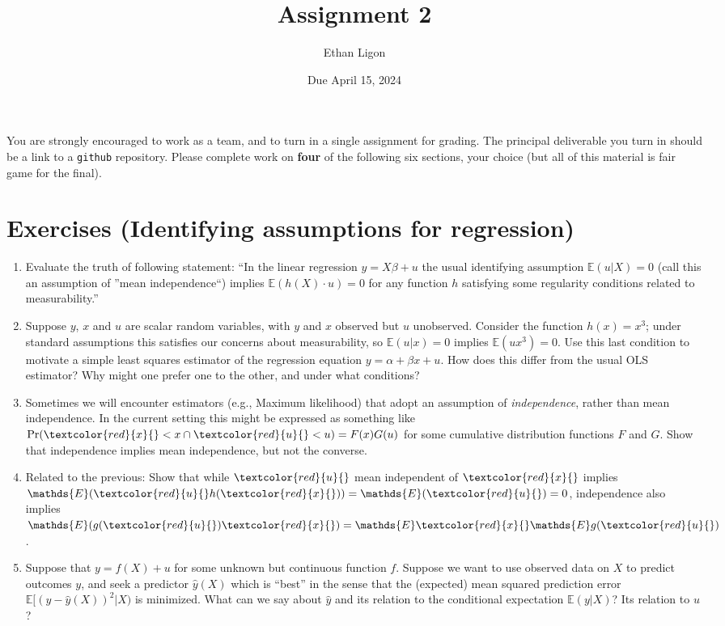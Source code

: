 \documentclass[12pt]{amsart}
\author{Ethan Ligon}
\date{Due April 15, 2024}
\title{Assignment 2}
\newcommand{\rv}[1]{\ensuremath{\textcolor{red}{#1}{}}}
\newcommand{\rvx}{\rv{x}}
\newcommand{\rvu}{\rv{u}}
\renewcommand{\E}{\ensuremath{\mathds{E}}}
\begin{document}
\maketitle
You are strongly encouraged to work as a  team, and to turn in a single assignment for grading.   The principal deliverable you turn in should be a link to a \texttt{github} repository.  Please complete work on \textbf{four} of the following six sections, your choice (but all of this material is fair game for the final).
\section{Exercises (Identifying assumptions for regression)}
\label{sec:org68430f5}

\begin{enumerate}
\item Evaluate the truth of following statement: ``In the linear regression \(y=X\beta + u\) the usual identifying assumption \(\E(u|X)=0\) (call this an assumption of ''mean independence``) implies \(\E(h(X)\cdot u)=0\) for any function \(h\) satisfying some regularity conditions related to measurability.''

\item Suppose \(y\), \(x\) and \(u\) are scalar random variables, with \(y\) and \(x\) observed but \(u\) unobserved.  Consider the function \(h(x)=x^3\); under standard assumptions this satisfies our concerns about measurability, so \(\E(u|x)=0\) implies \(\E(ux^3)=0\).   Use this last condition to motivate a simple least squares estimator of the regression equation \(y=\alpha + \beta x + u\).  How does this differ from the usual OLS estimator?  Why might one prefer one to the other, and under what conditions?

\item Sometimes we will encounter estimators (e.g., Maximum likelihood) that adopt an assumption of \emph{independence}, rather than mean independence.  In the current setting this might be expressed as something like \(\mbox{Pr}(\rvx<x \cap \rvu<u)=F(x)G(u)\) for some cumulative distribution functions \(F\) and \(G\).  Show that independence implies mean independence, but not the converse.

\item Related to the previous: Show that while \(\rvu\) mean independent of \(\rvx\) implies \(\E(\rvu h(\rvx))=\E(\rvu)=0\), independence also implies \(\E(g(\rvu)\rvx)=\E \rvx\E g(\rvu)\).

\item Suppose that \(y=f(X)+u\) for some unknown but continuous function \(f\).  Suppose we want to use observed data on \(X\) to predict outcomes \(y\), and seek a predictor \(\hat{y}(X)\) which is ``best'' in the sense that the (expected) mean squared prediction error \(\E [(y-\hat{y}(X))^2|X)\) is minimized.  What can we say about \(\hat{y}\) and its relation to the conditional expectation \(\E(y|X)\)?  Its relation to \(u\)?


\end{enumerate}
\end{document}
